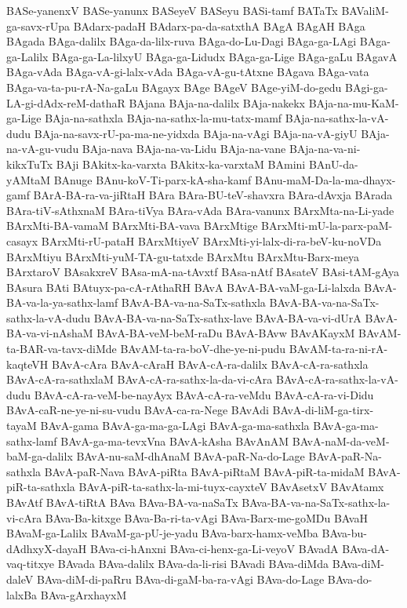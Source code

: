 {BASe-yanenxV
BASe-yanunx
BASeyeV
BASeyu
BASi-tamf
BATaTx
BAValiM-ga-savx-rUpa
BAdarx-padaH
BAdarx-pa-da-satxthA
BAgA
BAgAH
BAga
BAgada
BAga-dalilx
BAga-da-lilx-ruva
BAga-do-Lu-Dagi
BAga-ga-LAgi
BAga-ga-Lalilx
BAga-ga-La-lilxyU
BAga-ga-Lidudx
BAga-ga-Lige
BAga-gaLu
BAgavA
BAga-vAda
BAga-vA-gi-lalx-vAda
BAga-vA-gu-tAtxne
BAgava
BAga-vata
BAga-va-ta-pu-rA-Na-gaLu
BAgayx
BAge
BAgeV
BAge-yiM-do-gedu
BAgi-ga-LA-gi-dAdx-reM-dathaR
BAjana
BAja-na-dalilx
BAja-nakekx
BAja-na-mu-KaM-ga-Lige
BAja-na-sathxla
BAja-na-sathx-la-mu-tatx-mamf
BAja-na-sathx-la-vA-dudu
BAja-na-savx-rU-pa-ma-ne-yidxda
BAja-na-vAgi
BAja-na-vA-giyU
BAja-na-vA-gu-vudu
BAja-nava
BAja-na-va-Lidu
BAja-na-vane
BAja-na-va-ni-kikxTuTx
BAji
BAkitx-ka-varxta
BAkitx-ka-varxtaM
BAmini
BAnU-da-yAMtaM
BAnuge
BAnu-koV-Ti-parx-kA-sha-kamf
BAnu-maM-Da-la-ma-dhayx-gamf
BArA-BA-ra-va-jiRtaH
BAra
BAra-BU-teV-shavxra
BAra-dAvxja
BArada
BAra-tiV-sAthxnaM
BAra-tiVya
BAra-vAda
BAra-vanunx
BArxMta-na-Li-yade
BArxMti-BA-vamaM
BArxMti-BA-vava
BArxMtige
BArxMti-mU-la-parx-paM-casayx
BArxMti-rU-pataH
BArxMtiyeV
BArxMti-yi-lalx-di-ra-beV-ku-noVDa
BArxMtiyu
BArxMti-yuM-TA-gu-tatxde
BArxMtu
BArxMtu-Barx-meya
BArxtaroV
BAsakxreV
BAsa-mA-na-tAvxtf
BAsa-nAtf
BAsateV
BAsi-tAM-gAya
BAsura
BAti
BAtuyx-pa-cA-rAthaRH
BAvA
BAvA-BA-vaM-ga-Li-lalxda
BAvA-BA-va-la-ya-sathx-lamf
BAvA-BA-va-na-SaTx-sathxla
BAvA-BA-va-na-SaTx-sathx-la-vA-dudu
BAvA-BA-va-na-SaTx-sathx-lave
BAvA-BA-va-vi-dUrA
BAvA-BA-va-vi-nAshaM
BAvA-BA-veM-beM-raDu
BAvA-BAvw
BAvAKayxM
BAvAM-ta-BAR-va-tavx-diMde
BAvAM-ta-ra-boV-dhe-ye-ni-pudu
BAvAM-ta-ra-ni-rA-kaqteVH
BAvA-cAra
BAvA-cAraH
BAvA-cA-ra-dalilx
BAvA-cA-ra-sathxla
BAvA-cA-ra-sathxlaM
BAvA-cA-ra-sathx-la-da-vi-cAra
BAvA-cA-ra-sathx-la-vA-dudu
BAvA-cA-ra-veM-be-nayAyx
BAvA-cA-ra-veMdu
BAvA-cA-ra-vi-Didu
BAvA-caR-ne-ye-ni-su-vudu
BAvA-ca-ra-Nege
BAvAdi
BAvA-di-liM-ga-tirx-tayaM
BAvA-gama
BAvA-ga-ma-ga-LAgi
BAvA-ga-ma-sathxla
BAvA-ga-ma-sathx-lamf
BAvA-ga-ma-tevxVna
BAvA-kAsha
BAvAnAM
BAvA-naM-da-veM-baM-ga-dalilx
BAvA-nu-saM-dhAnaM
BAvA-paR-Na-do-Lage
BAvA-paR-Na-sathxla
BAvA-paR-Nava
BAvA-piRta
BAvA-piRtaM
BAvA-piR-ta-midaM
BAvA-piR-ta-sathxla
BAvA-piR-ta-sathx-la-mi-tuyx-cayxteV
BAvAsetxV
BAvAtamx
BAvAtf
BAvA-tiRtA
BAva
BAva-BA-va-naSaTx
BAva-BA-va-na-SaTx-sathx-la-vi-cAra
BAva-Ba-kitxge
BAva-Ba-ri-ta-vAgi
BAva-Barx-me-goMDu
BAvaH
BAvaM-ga-Lalilx
BAvaM-ga-pU-je-yadu
BAva-barx-hamx-veMba
BAva-bu-dAdhxyX-dayaH
BAva-ci-hAnxni
BAva-ci-henx-ga-Li-veyoV
BAvadA
BAva-dA-vaq-titxye
BAvada
BAva-dalilx
BAva-da-li-risi
BAvadi
BAva-diMda
BAva-diM-daleV
BAva-diM-di-paRru
BAva-di-gaM-ba-ra-vAgi
BAva-do-Lage
BAva-do-lalxBa
BAva-gArxhayxM
}
